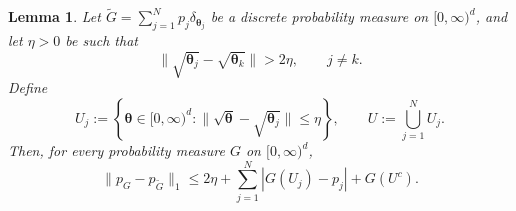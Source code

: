 \documentclass[twoside,12pt]{article}
\newtheorem{lem}[thm]{Lemma}
\begin{document}
\begin{lem}\label{lem:Poisson_L1_local_d}
Let $\tilde G=\sum_{j=1}^N p_j\delta_{\boldsymbol\theta_j}$ be a discrete probability measure on $[0,\infty)^d$, and let $\eta>0$ be such that
\begin{displaymath}
\|\sqrt{\boldsymbol\theta_j}-\sqrt{\boldsymbol\theta_k}\|>2\eta,
\qquad j\neq k.
\end{displaymath}
Define
\begin{displaymath}
U_j:=\left\{\boldsymbol\theta\in[0,\infty)^d:\|\sqrt{\boldsymbol\theta}-\sqrt{\boldsymbol\theta_j}\|\le \eta\right\},\qquad U:=\bigcup_{j=1}^N U_j.
\end{displaymath}
Then, for every probability measure $G$ on $[0,\infty)^d$,
\begin{displaymath}
\|p_G-p_{\tilde G}\|_1\le 2\eta+\sum_{j=1}^N |G(U_j)-p_j|+G(U^c).
\end{displaymath}
\end{lem}
\end{document}
